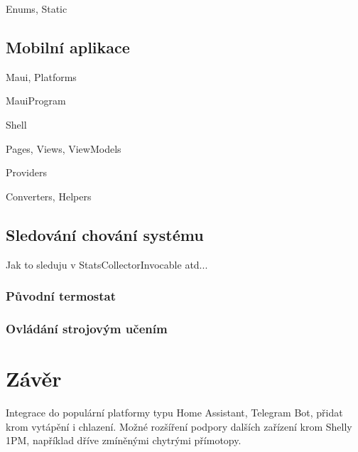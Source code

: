 Enums, Static


\section{Mobilní aplikace}
Maui, Platforms

MauiProgram

Shell

Pages, Views, ViewModels

Providers

Converters, Helpers


\section{Sledování chování systému}
Jak to sleduju v StatsCollectorInvocable atd...


\subsection{Původní termostat}



\subsection{Ovládání strojovým učením}


\chapter{Závěr}
\label{zaver}

Integrace do populární platformy typu Home Assistant, Telegram Bot, přidat krom vytápění i chlazení. Možné rozšíření podpory dalších zařízení krom Shelly 1PM, například dříve zmíněnými chytrými přímotopy.

